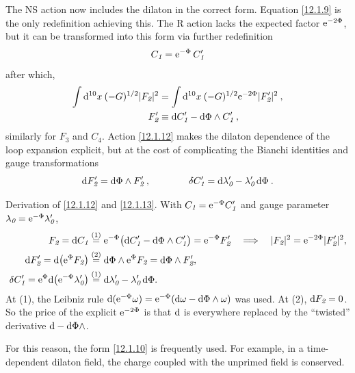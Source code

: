 The NS action now includes the dilaton in the correct form. Equation \eqref{12.1.9} is the only redefinition achieving this. The R action lacks the expected factor $\mathrm{e}^{-2\Phi}$, but it can be transformed into this form via further redefinition
\begin{equation}
	C_{\textit{1}} =\mathrm{e}^{-\Phi}\,C_{\textit{1}}^{\prime} \label{12.1.11}
\end{equation}
after which,
\begin{subequations} \label{12.1.12}
	\begin{align} 
		\int \mathrm{d}^{10}x\:(-G)^{1/2}\lvert F_{\textit{2}}\rvert^{2} &= \int \mathrm{d}^{10}x\: (-G)^{1/2}\mathrm{e}^{-2\Phi}\lvert F_{\textit{2}}^{\prime}\rvert^{2} \:, \label{12.1.12a} \\
		F_{\textit{2}}^{\prime} &\equiv \mathrm{d} C_{\textit{1}}^{\prime}-\mathrm{d}\Phi\wedge C_{\textit{1}}^{\prime} \:, \label{12.1.12b}
	\end{align}
\end{subequations}
similarly for $F_{\textit{3}}$ and $C_{\textit{4}}$. Action \eqref{12.1.12} makes the dilaton dependence of the loop expansion explicit, but at the cost of complicating the Bianchi identities and gauge transformations
\begin{equation}    
	\mathrm{d} F_{\textit{2}}^{\prime} = \mathrm{d} \Phi\wedge F_{\textit{2}}^{\prime}\:,\qquad\qquad 
	\delta C_{\textit{1}}^{\prime} =\mathrm{d} \lambda_{\textit{0}}^{\prime}- \lambda_{\textit{0}}^{\prime}\,\mathrm{d}\Phi \:. \label{12.1.13}
\end{equation}  
\begin{tcolorbox}[breakable]
	\begin{remark}
		Derivation of \eqref{12.1.12} and \eqref{12.1.13}. With $C_{\textit{1}}=\mathrm{e}^{-\Phi}C'_{\textit{1}}$ and gauge parameter $\lambda_{\textit{0}}=\mathrm{e}^{-\Phi}\lambda'_{\textit{0}}$,
		\begin{align*}
			F_{\textit{2}}=\mathrm{d} C_{\textit{1}}&\overset{(1)}{=} \mathrm{e}^{-\Phi}\bigl(\mathrm{d} C'_{\textit{1}}-\mathrm{d}\Phi\wedge C'_{\textit{1}}\bigr)=\mathrm{e}^{-\Phi}F'_{\textit{2}}
			\quad\Longrightarrow\quad \lvert F_{\textit{2}}\rvert^{2}=\mathrm{e}^{-2\Phi}\lvert F'_{\textit{2}}\rvert^{2},\\
			\mathrm{d} F'_{\textit{2}}=\mathrm{d}\bigl(\mathrm{e}^{\Phi}F_{\textit{2}}\bigr)&\overset{(2)}{=} \mathrm{d}\Phi\wedge\mathrm{e}^{\Phi}F_{\textit{2}}=\mathrm{d}\Phi\wedge F'_{\textit{2}},\\
			\delta C'_{\textit{1}}=\mathrm{e}^{\Phi}\mathrm{d}\bigl(\mathrm{e}^{-\Phi}\lambda'_{\textit{0}}\bigr)&\overset{(1)}{=} \mathrm{d}\lambda'_{\textit{0}}-\lambda'_{\textit{0}}\,\mathrm{d}\Phi .
		\end{align*}
		At (1), the Leibniz rule $\mathrm{d}(\mathrm{e}^{-\Phi}\omega)=\mathrm{e}^{-\Phi}(\mathrm{d}\omega-\mathrm{d}\Phi\wedge\omega)$ was used. At (2), $\mathrm{d} F_{\textit{2}}=0$. So the price of the explicit $\mathrm{e}^{-2\Phi}$ is that $\mathrm{d}$ is everywhere replaced by the ``twisted'' derivative $\mathrm{d}-\mathrm{d}\Phi\wedge$.
	\end{remark}
\end{tcolorbox}
For this reason, the form \eqref{12.1.10} is frequently used. For example, in a time-dependent dilaton field, the charge coupled with the unprimed field is conserved.

